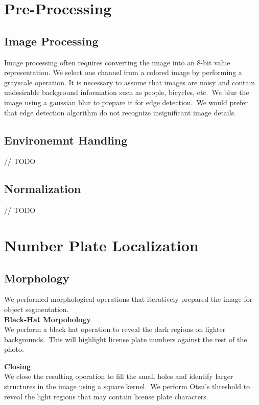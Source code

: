 \documentclass[a4paper,twoside,10pt]{report}
\begin{document}
\section{Pre-Processing}
\subsection{Image Processing}
Image processing often requires converting the image into an 8-bit value representation.
We select one channel from a colored image by performing a grayscale operation.
It is necessary to assume that images are noisy and contain undesirable background information such as people, bicycles, etc.\
We blur the image using a gaussian blur to prepare it for edge detection.\ 
We would prefer that edge detection algorithm do not recognize insignificant image details.\

\subsection{Environemnt Handling}
// TODO

\subsection{Normalization}
// TODO 
\section{Number Plate Localization}

\subsection{Morphology}

We performed morphological operations that iteratively prepared the image for object segmentation.  \\[2pt]
\textbf{Black-Hat Morpohology}\\
We perform a black hat operation to reveal the dark regions on lighter backgrounds.\ 
This will highlight license plate numbers against the rest of the photo.\
 
\textbf{Closing}\\
We close the resulting operation to fill the small holes and identify larger structures in the image using a square kernel.\ 
We perform Otsu's threshold to reveal the light regions that may contain license plate characters.
\end{document}

